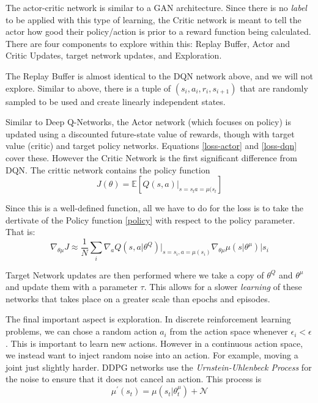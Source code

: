 \documentclass[doc, onecolumn, 12pt]{apa6}
\begin{document}
The actor-critic network is similar to a GAN architecture. Since there is no \emph{label} to be applied with this type of learning, the Critic network is meant to tell the actor how good their policy/action is prior to a reward function being calculated. There are four components to explore within this: Replay Buffer, Actor and Critic Updates, target network updates, and Exploration. 

The Replay Buffer is almost identical to the DQN network above, and we will not explore. Similar to above, there is a tuple of $(s_{i}, a_{i}, r_{i}, s_{i+1})$ that are randomly sampled to be used and create linearly independent states.

Similar to Deep Q-Networks, the Actor network (which focuses on policy) is updated using a discounted future-state value of rewards, though with target value (critic) and target policy networks. Equations \eqref{loss-actor} and \eqref{loss-dqn} cover these.  However the Critic Network is the first significant difference from DQN. The crittic network contains the policy function \begin{equation} \label{policy} 
J(\theta) = \mathbb{E}  \left[ Q(s,a) \vert_{s=s_{t}a=\mu(s_{t}} \right]
\end{equation} 

Since this is a well-defined function, all we have to do for the loss is to take the dertivate of the Policy function  \eqref{policy} with respect to the policy parameter. That is:  \begin{equation} \label{polderiv}  \nabla_{\theta \mu} J \approx \frac{1}{N} \sum_{i} \nabla_{a} Q(s, a \vert \theta^{Q}) \vert_{s=s_{i}, a = \mu (s_{i})}  \nabla_{\theta\mu} \mu(s \vert \theta ^{\mu}) \vert s_{i} \end{equation}

Target Network updates are then performed where we take a copy of $\theta^{Q}$ and $\theta^{\mu}$ and update them with a parameter $\tau$. This allows for a slower \emph{learning} of these networks that takes place on a greater scale than epochs and episodes. 

The final important aspect is exploration. In discrete reinforcement learning problems, we can chose a random action $a_{i}$ from the action space whenever $\epsilon_{i} < \epsilon$. This is important to learn new actions. However in a continuous action space, we instead want to inject random noise into an action. For example, moving a joint just slightly harder. DDPG networks use the \emph{Urnstein-Uhlenbeck Process} for the noise to ensure that it does not cancel an action. This process is \[ \mu ^{\prime}(s_{t}) = \mu( s_{t} \vert \theta^{\mu}_{t}) + \mathcal{N}\]
\end{document}
